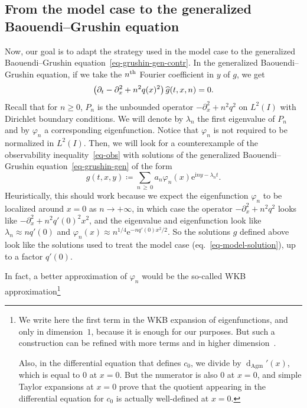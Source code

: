 \documentclass[10pt]{amsart}
\theoremstyle{definition}\newtheorem{defi}[theo]{Definition}\newtheorem{rema}[theo]{Remark}\newtheorem{exam}[theo]{Example}\newtheorem{exem}[theo]{Example}\newtheorem{nota}[theo]{Notation}
\renewcommand{\geq}{\geqslant}
\newcommand{\1}{\mathds 1}
\newcommand{\dagmon}{\mathop{\mathrm{d}}\nolimits_{\mathrm{Agm}}}
\newcommand{\eu}{\mathrm e}
\newcommand{\iu}{\mathrm i}
\renewcommand{\l}{\lambda}
\newcommand{\f}{\varphi}
\let\oldhat\hat
\renewcommand*{\hat}[1]{\mathchoice{\widehat{#1}}{\widehat{#1}}{\oldhat{#1}}{\oldhat{#1}}}
\begin{document}
\subsection{From the model case to the generalized Baouendi--Grushin equation}\label{sec-sketch-gen}

Now, our goal is to adapt the strategy used in the model case to the generalized Baouendi--Grushin equation~\eqref{eq-grushin-gen-contr}. In the generalized Baouendi--Grushin equation, if we take the $n^{\rm th}$ Fourier coefficient in $y$ of $g$, we get
\begin{equation}\label{eq-grushin-gen-fourier}
\left(\partial_t -\partial_x^2 +n^2q(x)^2\right)\hat g(t,x,n) = 0.
\end{equation}
Recall that for $n\geq 0$, $P_n$ is the unbounded operator $-\partial_x^2 + n^2 q^2$ on $L^2(I)$ with Dirichlet boundary conditions. We will denote by $\l_n$ the first eigenvalue of $P_n$ and by $\f_n$ a corresponding eigenfunction. Notice that $\f_n$ is not required to be normalized in $L^2(I)$. Then, we will look for a counterexample of the observability inequality~\eqref{eq-obs} with solutions of the generalized Baouendi--Grushin equation~\eqref{eq-grushin-gen} of the form
\begin{equation}\label{eq-obs-counter}
g(t,x,y) \coloneqq \sum_{n\,\geq\,0} a_{n} \f_n(x) \eu^{\iu n y - \lambda_n t}.
\end{equation}
Heuristically, this should work because we expect the eigenfunction $\f_n$ to be localized around $x = 0$ as $n\to +\infty$, in which case the operator $-\partial_x^2 + n^2 q^2$ looks like $-\partial_x^2 +n^2 q'(0)^2 x^2$, and the eigenvalue and eigenfunction look like $\l_n \approx nq'(0)$ and $\f_n(x) \approx n^{1/4} \eu^{-nq'(0)x^2\!/2}$. So the solutions $g$ defined above look like the solutions used to treat the model case (eq.~\eqref{eq-model-solution}), up to a factor $q'(0)$.

In fact, a better approximation of $\f_n$ would be the so-called WKB approximation\footnote{
We write here the first term in the WKB expansion of eigenfunctions, and only in dimension~$1$, because it is enough for our purposes. But such a construction can be refined with more terms and in higher dimension~\cite[Chapter~3 \& Chapter~6, Theorem~A.3]{DS99}.

Also, in the differential equation that defines $c_0$, we divide by $\dagmon'(x)$, which is equal to $0$ at $x = 0$. But the numerator is also $0$ at $x = 0$, and simple Taylor expansions at $x=0$ prove that the quotient appearing in the differential equation for $c_0$ is actually well-defined at $x=0$.
}
\end{document}

